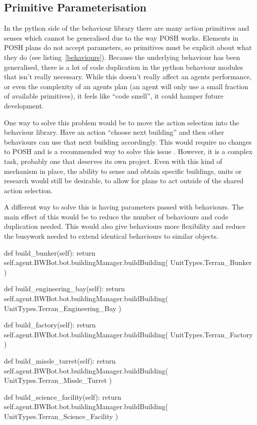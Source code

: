 \documentclass[11pt,openright,a4paper]{report}
\begin{document}
\subsection{Primitive Parameterisation}
\label{POSHPara}
In the python side of the behaviour library there are many action primitives and senses which cannot be generalised due to the way POSH works. Elements in POSH plans do not accept parameters, so primitives must be explicit about what they do (see listing~\ref{behaviours}). Because the underlying behaviour has been generalised, there is a lot of code duplication in the python behaviour modules that isn't really necessary. While this doesn't really affect an agents performance, or even the complexity of an agents plan (an agent will only use a small fraction of available primitives), it feels like ``code smell''\cite{Emden02javaquality}, it could hamper future development.

One way to solve this problem would be to move the action selection into the behaviour library. Have an action ``choose next building'' and then other behaviours can use that next building accordingly. This would require no changes to POSH and is a recommended way to solve this issue \cite{bryson2003behavior}. However, it is a complex task, probably one that deserves its own project. Even with this kind of mechanism in place, the ability to sense and obtain specific buildings, units or research would still be desirable, to allow for plans to act outside of the shared action selection.

A different way to solve this is having parameters passed with behaviours. The main effect of this would be to reduce the number of behaviours and code duplication needed. This would also give behaviours more flexibility and reduce the busywork needed to extend identical behaviours to similar objects.

\begin{Code}[frame=single,language=Python,tabsize=4,breaklines,breakatwhitespace,caption={A small selection of similar behaviours to build different buildings.},label=behaviours]
def build_bunker(self):
	return self.agent.BWBot.bot.buildingManager.buildBuilding( UnitTypes.Terran_Bunker )

def build_engineering_bay(self):
	return self.agent.BWBot.bot.buildingManager.buildBuilding( UnitTypes.Terran_Engineering_Bay )

def build_factory(self):
	return self.agent.BWBot.bot.buildingManager.buildBuilding( UnitTypes.Terran_Factory )

def build_missle_turret(self):
	return self.agent.BWBot.bot.buildingManager.buildBuilding( UnitTypes.Terran_Missle_Turret )

def build_science_facility(self):
	return self.agent.BWBot.bot.buildingManager.buildBuilding( UnitTypes.Terran_Science_Facility )
\end{Code}
\end{document}
